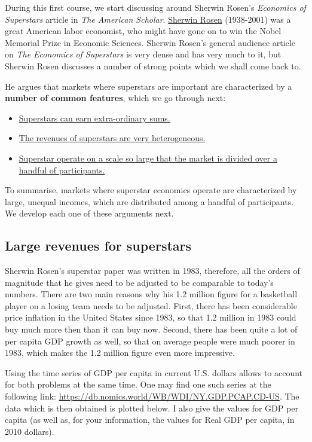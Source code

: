 \documentclass[]{book}
\providecommand{\tightlist}{%
  \setlength{\itemsep}{0pt}\setlength{\parskip}{0pt}}
\theoremstyle{definition}
\theoremstyle{definition}
\theoremstyle{definition}
\theoremstyle{remark}
\begin{document}
During this first course, we start discussing around Sherwin Rosen's
\emph{Economics of Superstars} article in \emph{The American Scholar}.
\href{https://en.wikipedia.org/wiki/Sherwin_Rosen}{Sherwin Rosen}
(1938-2001) was a great American labor economist, who might have gone on
to win the Nobel Memorial Prize in Economic Sciences. Sherwin Rosen's
general audience article on \emph{The Economics of Superstars} is very
dense and has very much to it, but Sherwin Rosen discusses a number of
strong points which we shall come back to.

He argues that markets where superstars are important are characterized
by a \textbf{number of common features}, which we go through next:

\begin{itemize}
\tightlist
\item
  \protect\hyperlink{superstar-incomes}{Superstars can earn
  extra-ordinary sums.}
\item
  \protect\hyperlink{inequality}{The revenues of superstars are very
  heterogeneous.}
\item
  \protect\hyperlink{scale}{Superstar operate on a scale so large that
  the market is divided over a handful of participants.}
\end{itemize}

To summarise, markets where superstar economics operate are
characterized by large, unequal incomes, which are distributed among a
handful of participants. We develop each one of these arguments next.

\hypertarget{superstar-incomes}{\subsection{Large revenues for
superstars}\label{superstar-incomes}}

Sherwin Rosen's superstar paper was written in 1983, therefore, all the
orders of magnitude that he gives need to be adjusted to be comparable
to today's numbers. There are two main reasons why his 1.2 million
figure for a basketball player on a losing team needs to be adjusted.
First, there has been considerable price inflation in the United States
since 1983, so that 1.2 million in 1983 could buy much more then than it
can buy now. Second, there has been quite a lot of per capita GDP growth
as well, so that on average people were much poorer in 1983, which makes
the 1.2 million figure even more impressive.

Using the time series of GDP per capita in current U.S. dollars allows
to account for both problems at the same time. One may find one such
series at the following link:
\url{https://db.nomics.world/WB/WDI/NY.GDP.PCAP.CD-US}. The data which
is then obtained is plotted below. I also give the values for GDP per
capita (as well as, for your information, the values for Real GDP per
capita, in 2010 dollars).
\end{document}
